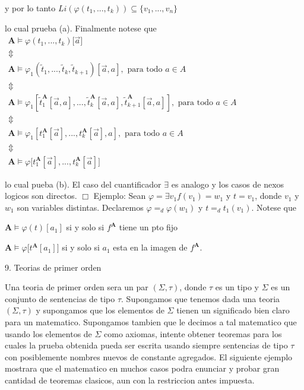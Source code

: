 y por lo tanto
\(\displaystyle Li(\varphi (t_{1},...,t_{k}))\subseteq \{v_{1},...,v_{n}\} \)

lo cual prueba (a). Finalmente notese que
\(\displaystyle \begin{array}{c} \mathbf{A}\models \varphi (t_{1},...,t_{k})\mathbf{[}\vec{a}] \\ \Updownarrow \\ \mathbf{A}\models \varphi _{1}(\tilde{t}_{1},...,\tilde{t}_{k},\tilde{t} _{k+1})[\vec{a},a],\text{ para todo }a\in A \\ \Updownarrow \\ \mathbf{A}\models \varphi _{1}[\tilde{t}_{1}^{\mathbf{A}}[\vec{a},a],..., \tilde{t}_{k}^{\mathbf{A}}[\vec{a},a],\tilde{t}_{k+1}^{\mathbf{A}}[\vec{a} ,a]],\text{ para todo }a\in A \\ \Updownarrow \\ \mathbf{A}\models \varphi _{1}[t_{1}^{\mathbf{A}}[\vec{a}],...,t_{k}^{ \mathbf{A}}[\vec{a}],a],\text{ para todo }a\in A \\ \Updownarrow \\ \mathbf{A}\models \varphi \lbrack t_{1}^{\mathbf{A}}[\vec{a}],...,t_{k}^{ \mathbf{A}}[\vec{a}]] \end{array} \)

lo cual pueba (b). El caso del cuantificador \(\exists \) es analogo y los casos de nexos logicos son directos. \(\Box\)
Ejemplo: Sean \(\varphi =\exists v_{1}f(v_{1})=w_{1}\) y \(t=v_{1}\), donde \(v_{1}\) y \(w_{1}\) son variables distintas. Declaremos \(\varphi =_{d}\varphi (w_{1})\) y \(t=_{d}t_{1}(v_{1})\). Notese que

\(\mathbf{A}\models \varphi (t)[a_{1}]\) si y solo si \(f^{\mathbf{A}}\) tiene un pto fijo

\(\mathbf{A}\models \varphi \lbrack t^{\mathbf{A}}[a_{1}]]\) si y solo si \( a_{1}\) esta en la imagen de \(f^{\mathbf{A}}.\)

9. Teorias de primer orden

Una teoria de primer orden sera un par \((\Sigma ,\tau )\), donde \( \tau \) es un tipo y \(\Sigma \) es un conjunto de sentencias de tipo \(\tau \). Supongamos que tenemos dada una teoria \((\Sigma ,\tau )\) y supongamos que los elementos de \(\Sigma \) tienen un significado bien claro para un matematico. Supongamos tambien que le decimos a tal matematico que usando los elementos de \(\Sigma \) como axiomas, intente obtener teoremas para los cuales la prueba obtenida pueda ser escrita usando siempre sentencias de tipo \(\tau \) con posiblemente nombres nuevos de constante agregados. El siguiente ejemplo mostrara que el matematico en muchos casos podra enunciar y probar gran cantidad de teoremas clasicos, aun con la restriccion antes impuesta.

